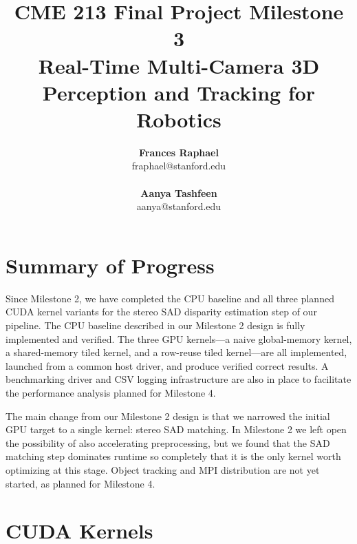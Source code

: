 \documentclass[11pt]{article}
\begin{document}
\title{CME 213 Final Project Milestone 3\\
Real-Time Multi-Camera 3D Perception and Tracking for Robotics}

\author{%
\begin{center}
\begin{minipage}[t]{0.46\textwidth}\centering
\textbf{Frances Raphael}\\
{\ttfamily fraphael@stanford.edu}\\
\end{minipage}\hfill
\begin{minipage}[t]{0.46\textwidth}\centering
\textbf{Aanya Tashfeen}\\
{\ttfamily aanya@stanford.edu}\\
\end{minipage}
\end{center}
}
\maketitle

\section{Summary of Progress}

Since Milestone 2, we have completed the CPU baseline and all three planned CUDA kernel variants for
the stereo SAD disparity estimation step of our pipeline. The CPU baseline described in our Milestone 2
design is fully implemented and verified. The three GPU kernels---a naive global-memory kernel, a
shared-memory tiled kernel, and a row-reuse tiled kernel---are all implemented, launched from a
common host driver, and produce verified correct results. A benchmarking driver and CSV logging
infrastructure are also in place to facilitate the performance analysis planned for Milestone 4.

The main change from our Milestone 2 design is that we narrowed the initial GPU target to a single
kernel: stereo SAD matching. In Milestone 2 we left open the possibility of also accelerating
preprocessing, but we found that the SAD matching step dominates runtime so completely that
it is the only kernel worth optimizing at this stage. Object tracking and MPI distribution are not
yet started, as planned for Milestone 4.

\section{CUDA Kernels}
\end{document}
